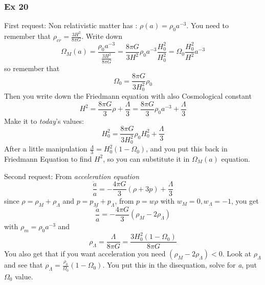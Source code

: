 \subsubsection{Ex 20}


First request: Non relativistic matter has : $\rho \left( a \right) = \rho _{0}a^{-3}$. You need to remember that $\rho _{cr} = \frac{3H^{2}}{8\pi G}$. Write down
\[
\Omega _{M}\left( a \right) = \frac{\rho _{0}a^{-3}}{ \frac{3H^{2}}{8\pi G}} = \frac{8\pi G}{3H^{2}}\rho _{0}a^{-3} \frac{H_{0}^{2}}{H_{0}^{2}} = \Omega _{0} \frac{H_{0}^{2}}{H^{2}}a^{-3}
\]
so remember that 
\[
\Omega _{0} = \frac{8\pi G}{3 H_{0}^{2}} \rho _{0}
\]
Then you write down the Friedmann equation with also Cosmological constant
\[
H^{2} = \frac{8\pi G}{3}\rho + \frac{\Lambda }{3} = \frac{8\pi G}{3}\rho _{0}a^{-3} + \frac{\Lambda }{3}	
\]
Make it to \emph{today}'s values:
\[
H_{0}^{2} = \frac{8\pi G}{3H^{2}_{0}}\rho _{0}H_{0}^{2} + \frac{\Lambda }{3}
\]
After a little manipulation $ \frac{\Lambda }{3} = H_{0}^{2}\left( 1 - \Omega _{0} \right)$, and you put this back in Friedmann Equation to find $H^{2}$, so you can substitute it in $\Omega _{M}\left( a \right)$ equation.\par

Second request: From \emph{acceleration equation}
\[
\frac{\ddot{a}}{a} = - \frac{4\pi G}{3}\left( \rho + 3p \right) + \frac{\Lambda }{3}
\]
since $\rho = \rho _{M}+ \rho _{\Lambda }$ and $p = p_{M} + p_{\Lambda }$, from $p = w \rho $ with $w_{M} = 0, w_{\Lambda } =- 1$, you get
\[
\frac{\ddot{a}}{a} = - \frac{4\pi G}{3} \left( \rho _{M} -2\rho _{\Lambda } \right)
\]
with $\rho _{m }= \rho _{0}a^{-3}$ and
\[
\rho  _{\Lambda } = \frac{\Lambda }{8\pi G} = \frac{3H_{0}^{2} \left( 1-\Omega _{0} \right)}{8\pi G}
\]
You also get that if you want acceleration you need $\left( \rho _{M} - 2\rho _{\Lambda } \right)<0$. Look at $\rho _{\Lambda }$ and see that $\rho _{\Lambda } = \frac{\rho _{0}}{\Omega _{0}}\left( 1-\Omega _{0} \right)$. You put this in the disequation, solve for \emph{a}, put $\Omega _{0} $ value.















